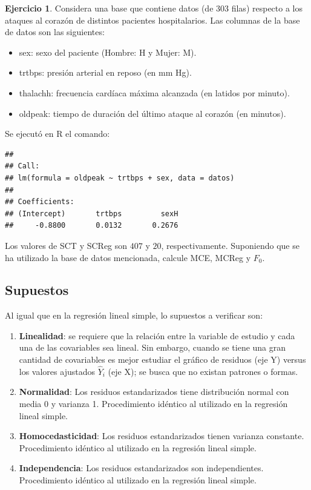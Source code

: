 \documentclass[
  11pt,
]{book}
\providecommand{\tightlist}{%
  \setlength{\itemsep}{0pt}\setlength{\parskip}{0pt}}
\theoremstyle{definition}
\theoremstyle{definition}
\theoremstyle{definition}
\newtheorem{exercise}{Ejercicio}[chapter]
\theoremstyle{definition}
\theoremstyle{remark}
\begin{document}
\begin{exercise}
Considera una base que contiene datos (de 303 filas) respecto a los ataques al corazón de distintos pacientes hospitalarios. Las columnas de la base de datos son las siguientes:

\begin{itemize}
\tightlist
\item
  sex: sexo del paciente (Hombre: H y Mujer: M).
\item
  trtbps: presión arterial en reposo (en mm Hg).
\item
  thalachh: frecuencia cardíaca máxima alcanzada (en latidos por minuto).
\item
  oldpeak: tiempo de duración del último ataque al corazón (en minutos).
\end{itemize}

Se ejecutó en R el comando:

\begin{verbatim}
## 
## Call:
## lm(formula = oldpeak ~ trtbps + sex, data = datos)
## 
## Coefficients:
## (Intercept)       trtbps         sexH  
##     -0.8800       0.0132       0.2676
\end{verbatim}

Los valores de SCT y SCReg son \(407\) y \(20\), respectivamente. Suponiendo que se ha utilizado la base de datos mencionada, calcule MCE, MCReg y \(F_0\).
\end{exercise}

\subsection{Supuestos}\label{regresion-lineal-multiple-supuestos}

Al igual que en la regresión lineal simple, lo supuestos a verificar son:

\begin{enumerate}
\def\labelenumi{\arabic{enumi}.}
\item
  \textbf{Linealidad}: se requiere que la relación entre la variable de estudio y cada una de las covariables sea lineal. Sin embargo, cuando se tiene una gran cantidad de covariables es mejor estudiar el gráfico de residuos (eje Y) versus los valores ajustados \(\widehat{Y}_i\) (eje X); se busca que no existan patrones o formas.
\item
  \textbf{Normalidad}: Los residuos estandarizados tiene distribución normal con media 0 y varianza 1. Procedimiento idéntico al utilizado en la regresión lineal simple.
\item
  \textbf{Homocedasticidad}: Los residuos estandarizados tienen varianza constante. Procedimiento idéntico al utilizado en la regresión lineal simple.
\item
  \textbf{Independencia}: Los residuos estandarizados son independientes. Procedimiento idéntico al utilizado en la regresión lineal simple.
\end{enumerate}
\end{document}
